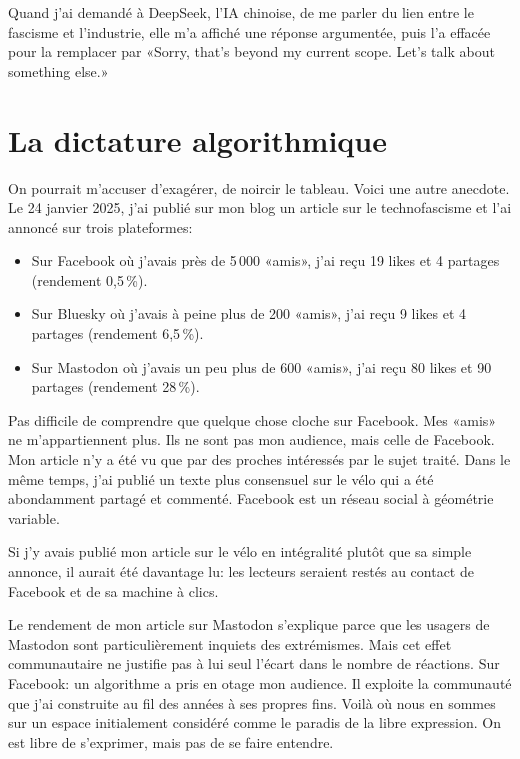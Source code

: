 \documentclass[a5paper, 10pt, twoside]{book}
\let\oldsection\section
\renewcommand{\section}[1]{%
  \oldsection{#1}%
  \par\vspace{\baselineskip}%
}
\providecommand{\tightlist}{%
  \setlength{\itemsep}{0pt}\setlength{\parskip}{0pt}%
}
\begin{document}
Quand j’ai demandé à DeepSeek, l’IA chinoise, de me parler du lien entre
le fascisme et l’industrie, elle m’a affiché une réponse argumentée,
puis l’a effacée pour la remplacer par «Sorry, that’s beyond my current
scope. Let’s talk about something else.»

\section{\texorpdfstring{La dictature
algorithmique}{  }}\label{la-dictature-algorithmique}

On pourrait m’accuser d’exagérer, de noircir le tableau. Voici une autre
anecdote. Le 24 janvier 2025, j’ai publié sur mon blog un article sur le
technofascisme et l’ai annoncé sur trois plateformes:

\begin{itemize}
\tightlist
\item
  Sur Facebook où j’avais près de 5\,000 «amis», j’ai reçu 19 likes et 4
  partages\,(rendement 0,5\,\%).
\item
  Sur Bluesky où j’avais à peine plus de 200 «amis», j’ai reçu 9 likes
  et 4 partages (rendement 6,5\,\%).
\item
  Sur Mastodon où j’avais un peu plus de 600 «amis», j’ai reçu 80 likes
  et 90 partages (rendement 28\,\%).
\end{itemize}

Pas difficile de comprendre que quelque chose cloche sur Facebook. Mes
«amis» ne m’appartiennent plus. Ils ne sont pas mon audience, mais celle
de Facebook. Mon article n’y a été vu que par des proches intéressés par
le sujet traité. Dans le même temps, j’ai publié un texte plus
consensuel sur le vélo qui a été abondamment partagé et commenté.
Facebook est un réseau social à géométrie variable.

Si j’y avais publié mon article sur le vélo en intégralité plutôt que sa
simple annonce, il aurait été davantage lu: les lecteurs seraient restés
au contact de Facebook et de sa machine à clics.

Le rendement de mon article sur Mastodon s’explique parce que les
usagers de Mastodon sont particulièrement inquiets des extrémismes. Mais
cet effet communautaire ne justifie pas à lui seul l’écart dans le
nombre de réactions. Sur Facebook: un algorithme a pris en otage mon
audience. Il exploite la communauté que j’ai construite au fil des
années à ses propres fins. Voilà où nous en sommes sur un espace
initialement considéré comme le paradis de la libre expression. On est
libre de s’exprimer, mais pas de se faire entendre.
\end{document}
